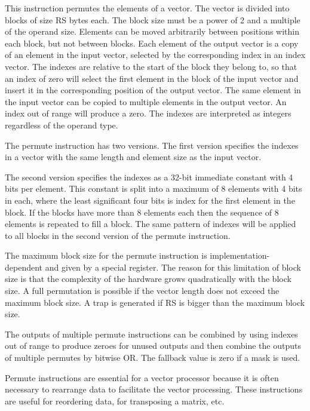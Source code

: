 \documentclass[forwardcom.tex]{subfiles}
\begin{document}
This instruction permutes the elements of a vector. The vector is divided into blocks of size RS bytes each. The block size must be a power of 2 and a multiple of the operand size. Elements can be moved arbitrarily between positions within each block, but not between blocks. Each element of the output vector is a copy of an element in the input vector, selected by the corresponding index in an index vector. The indexes are relative to the start of the block they belong to, so that an index of zero will select the first element in the block of the input vector and insert it in the corresponding position of the output vector. The same element in the input vector can be copied to multiple elements in the output vector. An index out of range will produce a zero. The indexes are interpreted as  integers regardless of the operand type.
\vspace{2mm}

The permute instruction has two versions. The first version specifies the indexes in a vector with the same length and element size as the input vector.
\vspace{2mm}

The second version specifies the indexes as a 32-bit immediate constant with 4 bits per element. This constant is split into a maximum of 8 elements with 4 bits in each, where the least significant four bits is index for the first element in the block.
If the blocks have more than 8 elements each then the sequence of 8 elements is repeated to fill a block. The same pattern of indexes will be applied to all blocks in the second version of the permute instruction.
\vspace{2mm}

The maximum block size for the permute instruction is implementation-dependent and given by a special register. The reason for this limitation of block size is that the complexity of the hardware grows quadratically with the block size. A full permutation is possible if the vector length does not exceed the maximum block size. A trap is generated if RS is bigger than the maximum block size.
\vspace{2mm}

The outputs of multiple permute instructions can be combined by using indexes out of range to produce zeroes for unused outputs and then combine the outputs of multiple permutes by bitwise OR. 
The fallback value is zero if a mask is used.
\vspace{2mm}

Permute instructions are essential for a vector processor because it is often necessary to rearrange data to facilitate the vector processing. These instructions are useful for reordering data, for transposing a matrix, etc. 
\vspace{2mm}
\end{document}
